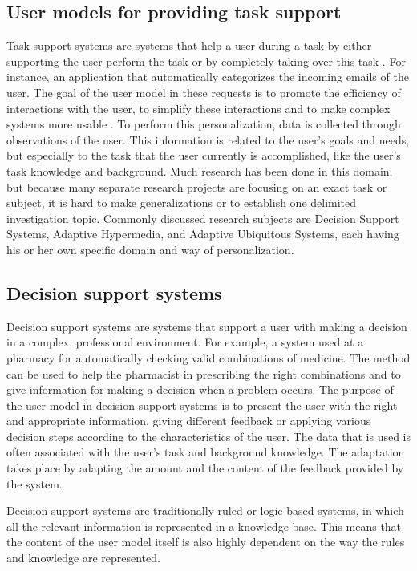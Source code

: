 \subsection{User models for providing task support}

Task support systems are systems that help a user during a task by either
supporting the user perform the task or by completely taking over this task
\cite{brun2010compass}. For instance, an application that
automatically categorizes the incoming emails of the user. The goal of the user
model in these requests is to promote the efficiency of interactions with the
user, to simplify these interactions and to make complex systems more usable
\cite{razmerita2009user}\cite{fischer2001user}.
To perform this personalization, data is collected through observations of the
user. This information is related to the user’s goals and needs, but especially
to the task that the user currently is accomplished, like the user’s task
knowledge and background. Much research has been done in this domain, but
because many separate research projects are focusing on an exact task or
subject, it is hard to make generalizations or to establish one delimited
investigation topic. Commonly discussed research subjects are Decision Support
Systems, Adaptive Hypermedia, and Adaptive Ubiquitous Systems, each having his
or her own specific domain and way of personalization.

\subsection{Decision support systems}

Decision support systems are systems that support a user with making a decision
in a complex, professional environment. For example, a
system used at a pharmacy for automatically checking valid combinations of
medicine. The method can be used to help the pharmacist in prescribing the right
combinations and to give information for making a decision when a problem
occurs. The purpose of the user model in decision support systems is to present
the user with the right and appropriate information, giving different feedback
or applying various decision steps according to the characteristics of the
user. The data that is used is often associated with the user’s task and
background knowledge. The adaptation takes place by adapting the amount and
the content of the feedback provided by the system.


Decision support systems are traditionally ruled or logic-based systems, in
which all the relevant information is represented in a knowledge base. This
means that the content of the user model itself is also highly dependent on the
way the rules and knowledge are represented.


